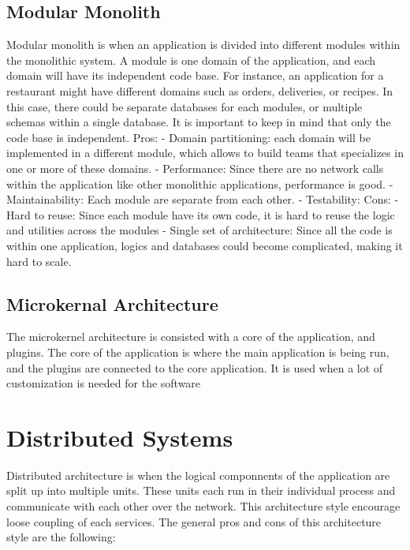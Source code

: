 \subsection[Modular Monolith]{Modular Monolith}
Modular monolith is when an application is divided into different modules within the monolithic system. A module is one domain of the application,
and each domain will have its independent code base. For instance, an application for a restaurant might have different domains such as orders, deliveries, or recipes.
In this case, there could be separate databases for each modules, or multiple schemas within a single database.
It is important to keep in mind that only the code base is independent.
Pros: 
-	Domain partitioning: each domain will be implemented in a different module, which allows to build teams that specializes in one or more of these domains.
-	Performance: Since there are no network calls within the application like other monolithic applications, performance is good.
-	Maintainability: Each module are separate from each other.
-	Testability:
Cons:
-	Hard to reuse: Since each module have its own code, it is hard to reuse the logic and utilities across the modules
-	Single set of architecture: Since all the code is within one application, logics and databases could become complicated, making it hard to scale.

\subsection[Microkernal Architecture]{Microkernal Architecture}
The microkernel architecture is consisted with a core of the application, and plugins. 
The core of the application is where the main application is being run, and the plugins are connected to the core application. 
It is used when a lot of customization is needed for the software


\section[Distributed Systems]{Distributed Systems}\label{sec:newsec}
Distributed architecture is when the logical componnents of the application are split up into multiple units. 
These units each run in their individual process and communicate with each other over the network. 
This architecture style encourage loose coupling of each services. The general pros and cons of this architecture style are the following:

